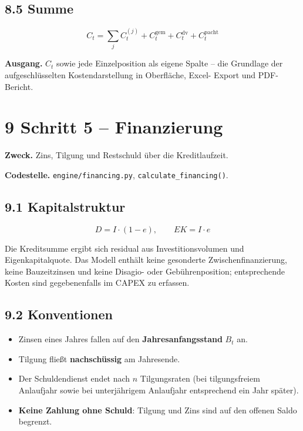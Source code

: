 \documentclass[
  a4paper,
  10pt]{article}
\providecommand{\tightlist}{%
  \setlength{\itemsep}{0pt}\setlength{\parskip}{0pt}}
\begin{document}
\hypertarget{summe}{%
\subsection{8.5 Summe}\label{summe}}

\[ C_t = \sum_j C^{(j)}_t + C^{\mathrm{gem}}_t + C^{\mathrm{dv}}_t + C^{\mathrm{pacht}}_t \]

\textbf{Ausgang.} \(C_t\) sowie jede Einzelposition als eigene Spalte --
die Grundlage der aufgeschlüsselten Kostendarstellung in Oberfläche,
Excel- Export und PDF-Bericht.

\hypertarget{schritt-5-finanzierung}{%
\section{9 Schritt 5 -- Finanzierung}\label{schritt-5-finanzierung}}

\textbf{Zweck.} Zins, Tilgung und Restschuld über die Kreditlaufzeit.

\textbf{Codestelle.} \nolinkurl{engine/financing.py},
\texttt{calculate\_financing()}.

\hypertarget{kapitalstruktur}{%
\subsection{9.1 Kapitalstruktur}\label{kapitalstruktur}}

\[ D = I \cdot (1 - e), \qquad EK = I \cdot e \]

Die Kreditsumme ergibt sich residual aus Investitionsvolumen und
Eigenkapitalquote. Das Modell enthält keine gesonderte
Zwischenfinanzierung, keine Bauzeitzinsen und keine Disagio- oder
Gebührenposition; entsprechende Kosten sind gegebenenfalls im CAPEX zu
erfassen.

\hypertarget{konventionen}{%
\subsection{9.2 Konventionen}\label{konventionen}}

\begin{itemize}
\tightlist
\item
  Zinsen eines Jahres fallen auf den \textbf{Jahresanfangsstand} \(B_t\)
  an.
\item
  Tilgung fließt \textbf{nachschüssig} am Jahresende.
\item
  Der Schuldendienst endet nach \(n\) Tilgungsraten (bei tilgungsfreiem
  Anlaufjahr sowie bei unterjährigem Anlaufjahr entsprechend ein Jahr
  später).
\item
  \textbf{Keine Zahlung ohne Schuld}: Tilgung und Zins sind auf den
  offenen Saldo begrenzt.
\end{itemize}
\end{document}
